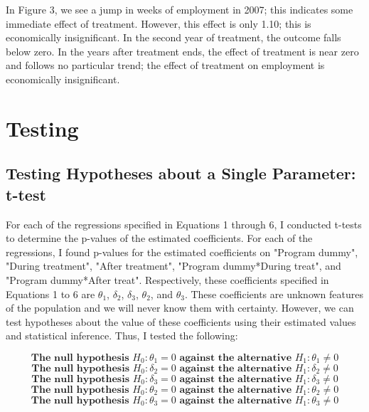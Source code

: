\documentclass[a4paper]{article}
\begin{document}
In Figure 3, we see a jump in weeks of employment in 2007; this indicates some immediate effect of treatment. However, this effect is only 1.10; this is economically insignificant. In the second year of treatment, the outcome falls below zero. In the years after treatment ends, the effect of treatment is near zero and follows no particular trend; the effect of treatment on employment is economically insignificant.


\section{Testing}

\subsection{Testing Hypotheses about a Single Parameter: t-test}

For each of the regressions specified in Equations 1 through 6, I conducted t-tests to determine the p-values of the estimated coefficients. For each of the regressions, I found p-values for the estimated coefficients on "Program dummy", "During treatment", "After treatment", "Program dummy*During treat", and "Program dummy*After treat". Respectively, these coefficients specified in Equations 1 to 6 are $\theta_1$, $\delta_2$, $\delta_3$, $\theta_2$, and $\theta_3$. These coefficients are unknown features of the population and we will never know them with certainty.  However, we can test hypotheses about the value of these coefficients using their estimated values and statistical inference. Thus, I tested the following:


\begin{equation}
\textbf{The null hypothesis $H_0: \theta_1 = 0$ against the alternative $H_1: \theta_1 \ne 0$}
\end{equation}
\begin{equation}
\textbf{The null hypothesis $H_0: \delta_2 = 0$ against the alternative $H_1: \delta_2 \ne 0$}
\end{equation}
\begin{equation}
\textbf{The null hypothesis $H_0: \delta_3 = 0$ against the alternative $H_1: \delta_3 \ne 0$}
\end{equation}
\begin{equation}
\textbf{The null hypothesis $H_0: \theta_2 = 0$ against the alternative $H_1: \theta_2 \ne 0$}
\end{equation}
\begin{equation}
\textbf{The null hypothesis $H_0: \theta_3 = 0$ against the alternative $H_1: \theta_3 \ne 0$}
\end{equation}
\end{document}
